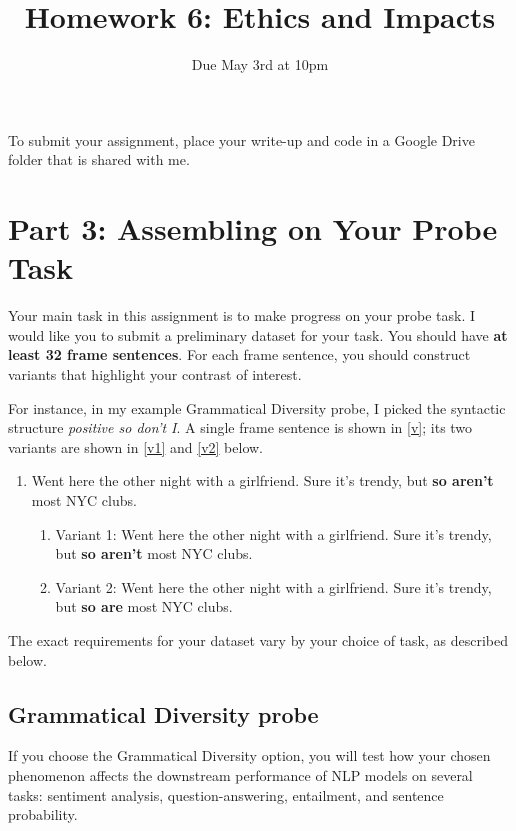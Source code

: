 \documentclass[12pt,table]{article}
\title{Homework 6: Ethics and Impacts}
\author{Due May 3rd at 10pm}
\date{}
\begin{document}
\maketitle{}

To submit your assignment, place your write-up and code in a Google Drive folder that is shared with me.

\section*{Part 3: Assembling on Your Probe Task}

Your main task in this assignment is to make progress on your probe task. I would like you to submit a preliminary dataset for your task. You should have \textbf{at least 32 frame sentences}. For each frame sentence, you should construct variants that highlight your contrast of interest. 

For instance, in my example Grammatical Diversity probe, I picked the syntactic structure \textit{positive so don't I}. A single frame sentence is shown in \ref{v}; its two variants are shown in \ref{v1} and \ref{v2} below.

\begin{enumerate}
\item\label{v} Went here the other night with a girlfriend. Sure it's trendy, but \textbf{so aren't} most NYC clubs.
\begin{enumerate}
\item\label{v1} Variant 1: Went here the other night with a girlfriend. Sure it's trendy, but \textbf{so aren't} most NYC clubs.
\item\label{v2} Variant 2: Went here the other night with a girlfriend. Sure it's trendy, but \textbf{so are} most NYC clubs.
\end{enumerate}
\end{enumerate}

The exact requirements for your dataset vary by your choice of task, as described below.

\subsection*{Grammatical Diversity probe}

If you choose the Grammatical Diversity option, you will test how your chosen phenomenon affects the downstream performance of NLP models on several tasks: sentiment analysis, question-answering, entailment, and sentence probability.
\end{document}
